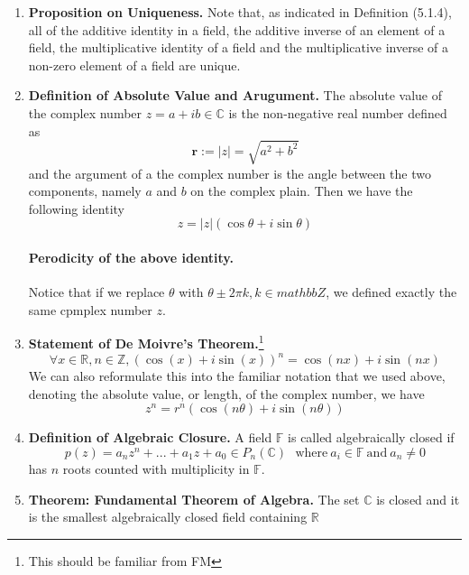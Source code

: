 \documentclass[oneside, 12pt]{book}
\newcommand{\settag}[1]{\renewcommand{\theenumi}{#1}}
\newcommand{\R}{\mathbb{R}}
\newcommand{\real}{\mathbb{R}}
\newcommand{\complex}{\mathbb{C}}
\newcommand{\tbf}[1]{\textbf{#1}}
\newcommand{\para}[1]{\item \tbf{#1}}
\begin{document}
\begin{enumerate}
    \settag{5.1.7}
    \para{Proposition on Uniqueness.} Note that, as indicated in Definition (5.1.4), all of the additive identity in a field, 
    the additive inverse of an element of a field, the multiplicative identity of a field and the multiplicative inverse of a 
    non-zero element of a field are unique.

    \settag{5.1.8}
    \para{Definition of Absolute Value and Arugument.} The absolute value of the complex number $z = a + ib\in \complex$
    is the non-negative real number defined as
    \begin{equation*}
        \mathbf{r} := |z| = \sqrt{a^2 + b^2}
    \end{equation*}
    and the argument of a the complex number is the angle between the two components, namely $a$ and $b$
    on the complex plain. Then we have the following identity
    \begin{equation*}
        z = |z|(\cos \theta + i\sin \theta)
    \end{equation*}
    \paragraph{Perodicity of the above identity.} Notice that if we replace $\theta$ with $\theta \pm
    2\pi k, k\in mathbb{Z}$, we defined exactly the same cpmplex number $z$. 

    \settag{5.1.9}
    \para{Statement of De Moivre's Theorem.}\footnote{This should be familiar from FM}
    \begin{equation*}
        \forall x\in \R, n\in \mathbb{Z}, \left(\cos(x) + i\sin(x)\right)^n = \cos(nx) + i\sin(nx)
    \end{equation*}
    We can also reformulate this into the familiar notation that we used above, denoting the absolute
    value, or length, of the complex number, we have
    \begin{equation*}
        z^n = r^n\left(\cos(n\theta) + i\sin(n\theta)\right)
    \end{equation*}

    \settag{5.1.11}
    \para{Definition of Algebraic Closure.} A field $\mathbb{F}$ is called algebraically closed if
    \begin{equation*}
        p(z) = a_nz^n + ... + a_1z + a_0\in P_n(\complex)~~~\text{where}~a_i\in \mathbb{F}~\text{and}~a_n\neq 0
    \end{equation*}
    has $n$ roots counted with multiplicity in $\mathbb{F}$.

    \settag{5.1.12}
    \para{Theorem: Fundamental Theorem of Algebra.} The set $\complex$ is closed and it is the smallest algebraically closed field 
    containing $\real$
\end{enumerate}
\end{document}
